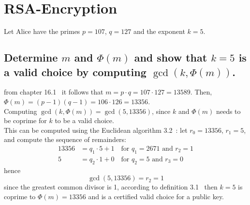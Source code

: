 \documentclass[12pt]{article}
\begin{document}
\section*{RSA-Encryption}
Let Alice have the primes $p = 107$, $q = 127$ and the exponent $k = 5$.
\subsection*{Determine $m$ and $\Phi(m)$ and show that $k = 5$ is a valid choice by computing $\gcd(k, \Phi(m))$.}
from chapter 16.1~\cite{Algebra} it follows that $m = p\cdot q = 107 \cdot 127 = 13589$.
Then, $\Phi(m) = (p-1)(q-1) = 106 \cdot 126 = 13356$.\\
Computing  $\gcd(k, \Phi(m)) = \gcd(5, 13356)$, since $k$ and $\Phi(m)$ needs to be coprime for $k$ to be a valid choice.\\
This can be computed using the Euclidean algorithm 3.2~\cite{Algebra}:
let $r_0 = 13356$, $r_1 = 5$, and compute the sequence of remainders:
\begin{align*}
13356 &= q_1 \cdot 5 + 1 \quad \text{for } q_1 = 2671 \text{ and } r_2 = 1\\ 
5 &= q_2 \cdot 1 + 0 \quad \text{for } q_2 = 5 \text{ and } r_3 = 0
\end{align*}
hence 
\begin{equation*}
    \gcd(5, 13356) = r_2 = 1
\end{equation*}
since the greatest common divisor is 1, according to definition 3.1~\cite{Algebra} then $k = 5$ is coprime to $\Phi(m) = 13356$ and is a certified valid choice for a public key.
\end{document}
